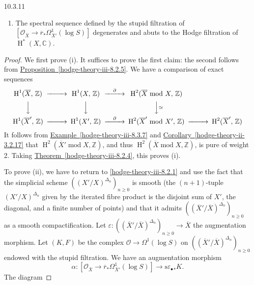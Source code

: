 \begin{lemma}{10.3.11}
\begin{enumerate}
    
 \item[(ii)]
      The spectral sequence defined by the stupid filtration of \([\mathcal {O}_{\overline {X}}\to \overline {r}_*\Omega _{\overline {X}'}^1(\log  S)]\) degenerates and abuts to the Hodge filtration of \(\operatorname {H}^*(X,\mathbb {C})\).
    

  \end{enumerate}\begin{proof}\par{}We first prove (i).
      It suffices to prove the first claim: the second follows from \hyperref[hodge-theory-iii-8.2.5]{Proposition~\ref*{hodge-theory-iii-8.2.5}}.
      We have a comparison of exact sequences
      \[         \begin {CD}           \operatorname {H}^1(\overline {X},\,\mathbb {Z}) @>>> \operatorname {H}^1(X,\,\mathbb {Z}) @>{\partial }>> \operatorname {H}^2(\overline {X}\,\operatorname {mod}\, X,\,\mathbb {Z})         \\@VVV @VVV @VV{\simeq }V         \\\operatorname {H}^1(\overline {X}',\,\mathbb {Z}) @>>> \operatorname {H}^1(X',\,\mathbb {Z}) @>{\partial }>> \operatorname {H}^2(\overline {X}'\,\operatorname {mod}\, X',\,\mathbb {Z}) @>>> \operatorname {H}^2(\overline {X}',\,\mathbb {Z})         \end {CD}       \]
      It follows from \hyperref[hodge-theory-iii-8.3.7]{Example~\ref*{hodge-theory-iii-8.3.7}} and \hyperref[hodge-theory-ii-3.2.17]{Corollary~\ref*{hodge-theory-ii-3.2.17}} that \(\operatorname {H}^2(\overline {X}'\operatorname {mod} X,\mathbb {Z})\), and thus \(\operatorname {H}^2(\overline {X}\operatorname {mod} X,\mathbb {Z})\), is pure of weight 2.
      Taking \hyperref[hodge-theory-iii-8.2.4]{Theorem~\ref*{hodge-theory-iii-8.2.4}}, this proves (i).\par{}To prove (ii), we have to return to \cref{hodge-theory-iii-8.2.1} and use the fact that the simplicial scheme \(((X'/X)^{\Delta _n})_{n\geqslant 0}\) is smooth (the \((n+1)\)-tuple \((X'/X)^{\Delta _n}\) given by the iterated fibre product is the disjoint sum of \(X'\), the diagonal, and a finite number of points) and that it admits \(((\overline {X}'/\overline {X})^{\Delta _n})_{n\geqslant 0}\) as a smooth compactification.
      Let \(\varepsilon \colon ((\overline {X}'/\overline {X})^{\Delta _n})_{n\geqslant 0}\to \overline {X}\) the augmentation morphism.
      Let \((K,F)\) be the complex \(\mathcal {O}\to \Omega ^1(\log  S)\) on \(((\overline {X}'/\overline {X})^{\Delta _n})_{n\geqslant 0}\) endowed with the stupid filtration.
      We have an augmentation morphism
      \[         \alpha \colon          [\mathcal {O}_{\overline {X}}\to \overline {r}_*\Omega _{\overline {X}'}^1(\log  S)]         \to  \mathrm {s}{\varepsilon _\bullet }_*K.       \]
      The diagram
      

\end{proof}
\end{lemma}
